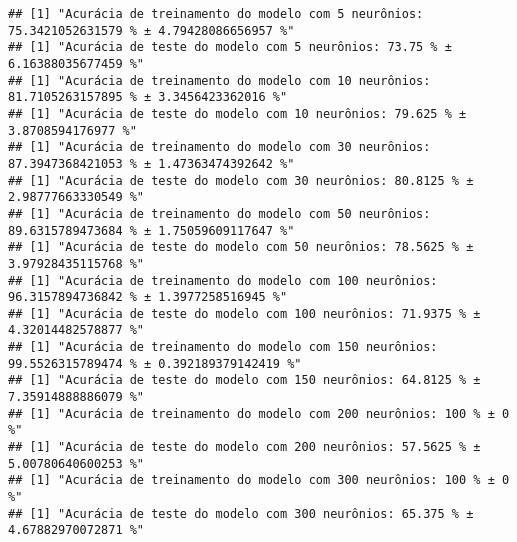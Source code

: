 \documentclass[
]{article}
\newenvironment{Shaded}{\begin{snugshade}}{\end{snugshade}}
\newcommand{\CommentTok}[1]{\textcolor[rgb]{0.56,0.35,0.01}{\textit{#1}}}
\newcommand{\DecValTok}[1]{\textcolor[rgb]{0.00,0.00,0.81}{#1}}
\newcommand{\KeywordTok}[1]{\textcolor[rgb]{0.13,0.29,0.53}{\textbf{#1}}}
\newcommand{\NormalTok}[1]{#1}
\newcommand{\OperatorTok}[1]{\textcolor[rgb]{0.81,0.36,0.00}{\textbf{#1}}}
\newcommand{\StringTok}[1]{\textcolor[rgb]{0.31,0.60,0.02}{#1}}
\begin{document}
\begin{Shaded}
\end{Shaded}

\begin{verbatim}
## [1] "Acurácia de treinamento do modelo com 5 neurônios: 75.3421052631579 % ± 4.79428086656957 %"
## [1] "Acurácia de teste do modelo com 5 neurônios: 73.75 % ± 6.16388035677459 %"
## [1] "Acurácia de treinamento do modelo com 10 neurônios: 81.7105263157895 % ± 3.3456423362016 %"
## [1] "Acurácia de teste do modelo com 10 neurônios: 79.625 % ± 3.8708594176977 %"
## [1] "Acurácia de treinamento do modelo com 30 neurônios: 87.3947368421053 % ± 1.47363474392642 %"
## [1] "Acurácia de teste do modelo com 30 neurônios: 80.8125 % ± 2.98777663330549 %"
## [1] "Acurácia de treinamento do modelo com 50 neurônios: 89.6315789473684 % ± 1.75059609117647 %"
## [1] "Acurácia de teste do modelo com 50 neurônios: 78.5625 % ± 3.97928435115768 %"
## [1] "Acurácia de treinamento do modelo com 100 neurônios: 96.3157894736842 % ± 1.3977258516945 %"
## [1] "Acurácia de teste do modelo com 100 neurônios: 71.9375 % ± 4.32014482578877 %"
## [1] "Acurácia de treinamento do modelo com 150 neurônios: 99.5526315789474 % ± 0.392189379142419 %"
## [1] "Acurácia de teste do modelo com 150 neurônios: 64.8125 % ± 7.35914888886079 %"
## [1] "Acurácia de treinamento do modelo com 200 neurônios: 100 % ± 0 %"
## [1] "Acurácia de teste do modelo com 200 neurônios: 57.5625 % ± 5.00780640600253 %"
## [1] "Acurácia de treinamento do modelo com 300 neurônios: 100 % ± 0 %"
## [1] "Acurácia de teste do modelo com 300 neurônios: 65.375 % ± 4.67882970072871 %"
\end{verbatim}
\end{document}
